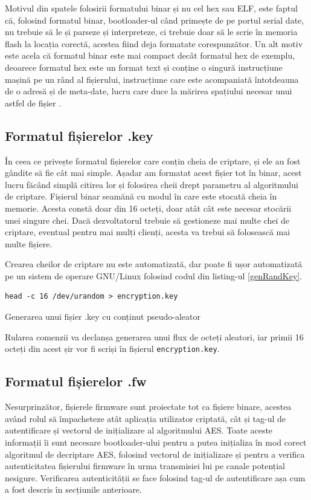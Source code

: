 \documentclass[12pt,a4paper,titlepage]{report}
\begin{document}
Motivul din spatele folosirii formatului binar și nu cel hex sau ELF, este faptul că, folosind formatul binar, bootloader-ul când primește de pe portul serial date, nu trebuie să le și parseze și interpreteze, ci trebuie doar să le scrie în memoria flash la locația corectă, acestea fiind deja formatate corespunzător. Un alt motiv este acela că formatul binar este mai compact decât formatul hex de exemplu, deoarece formatul hex este un format text și conține o singură instrucțiune mașină pe un rând al fișierului, instrucțiune care este acompaniată întotdeauna de o adresă și de meta-date, lucru care duce la mărirea spațiului necesar unui astfel de fișier \cite{hexFormat}.

\subsection{Formatul fișierelor .key}
În ceea ce privește formatul fișierelor care conțin cheia de criptare, și ele au fost gândite să fie cât mai simple.
Așadar am formatat acest fișier tot în binar, acest lucru făcând simplă citirea lor și folosirea cheii drept parametru al algoritmului de criptare. Fișierul binar seamănă cu modul în care este stocată cheia în memorie. Acesta constă doar din 16 octeți, doar atât cât este necesar stocării unei singure chei. Dacă dezvoltatorul trebuie să gestioneze mai multe chei de criptare, eventual pentru mai mulți clienți, acesta va trebui să folosească mai multe fișiere.

Crearea cheilor de criptare nu este automatizată, dar poate fi ușor automatizată pe un sistem de operare GNU/Linux folosind codul din listing-ul \ref{genRandKey}.

\begin{listing}[h]
\begin{verbatim}
head -c 16 /dev/urandom > encryption.key
\end{verbatim}

\caption{Generarea unui fișier .key cu conținut pseudo-aleator}
\label{genRandKey}
\end{listing}

Rularea comenzii va declanșa generarea unui flux de octeți aleatori, iar primii 16 octeți din acest șir vor fi scriși în fișierul \texttt{encryption.key}.

\subsection{Formatul fișierelor .fw}
Nesurprinzător, fișierele firmware sunt proiectate tot ca fișiere binare, acestea având rolul să împacheteze atât aplicația utilizator criptată, cât și tag-ul de autentificare și vectorul de inițializare al algoritmului AES.
Toate aceste informații îi sunt necesare bootloader-ului pentru a putea inițializa în mod corect algoritmul de decriptare AES, folosind vectorul de inițializare și pentru a verifica autenticitatea fișierului firmware în urma transmisiei lui pe canale potențial nesigure. Verificarea autenticității se face folosind tag-ul de autentificare așa cum a fost descris în secțiunile anterioare.
\end{document}
